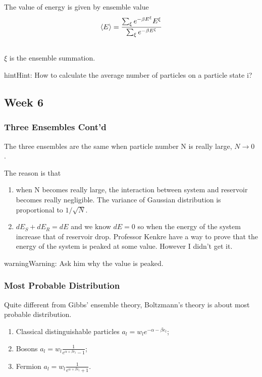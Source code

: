 \documentclass[letterpaper,10pt,english]{sphinxmanual}
\newcommand{\avg}[1]{\left< #1 \right>}
\begin{document}
The value of energy is given by ensemble value
\begin{gather}
\begin{split}\avg{E} = \frac{\sum _\xi e^{-\beta E^\xi} E^\xi}{\sum _\xi e^{-\beta E^\xi}}\end{split}\notag\\\begin{split}\end{split}\notag
\end{gather}
$\xi$ is the ensemble summation.

\begin{notice}{hint}{Hint:}
How to calculate the average number of particles on a particle state i?
\end{notice}


\subsection{Week 6}
\label{equilibrium/week6:week-6}\label{equilibrium/week6::doc}

\subsubsection{Three Ensembles Cont'd}
\label{equilibrium/week6:three-ensembles-cont-d}
The three ensembles are the same when particle number N is really large, $N\rightarrow 0$ .

The reason is that
\begin{enumerate}
\item {} 
when N becomes really large, the interaction between system and reservoir becomes really negligible. The variance of Gaussian distribution is proportional to $1/\sqrt{N}$.

\item {} 
$dE_S+dE_R=dE$ and we know $dE=0$ so when the energy of the system increase that of reservoir drop. Professor Kenkre have a way to prove that the energy of the system is peaked at some value. However I didn't get it.

\end{enumerate}

\begin{notice}{warning}{Warning:}
Ask him why the value is peaked.
\end{notice}


\subsubsection{Most Probable Distribution}
\label{equilibrium/week6:most-probable-distribution}
Quite different from Gibbs' ensemble theory, Boltzmann's theory is about most probable distribution.
\begin{enumerate}
\item {} 
Classical distinguishable particles $a_l = w_l e^{-\alpha -\beta e_l}$;

\item {} 
Bosons $a_l = w_l \frac{1}{e^{\alpha+\beta e_l} - 1}$;

\item {} 
Fermion $a_l = w_l \frac{1}{e^{\alpha + \beta e_l} + 1}$.

\end{enumerate}
\end{document}
